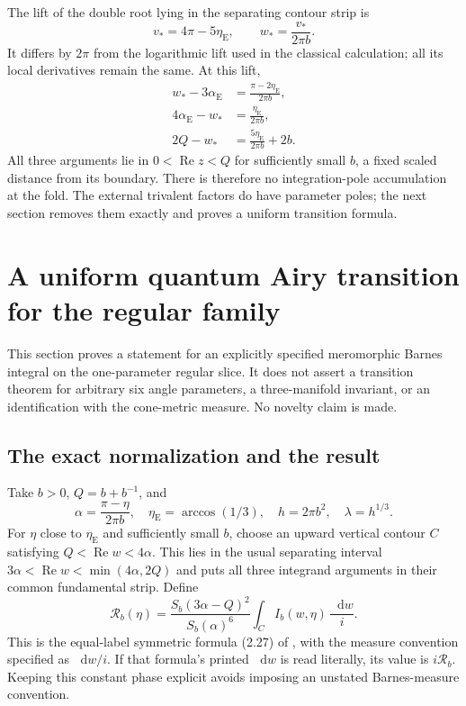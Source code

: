 \documentclass[11pt,a4paper]{article}
\numberwithin{equation}{section}
\theoremstyle{definition}
\theoremstyle{remark}
\newcommand{\dd}{\mathop{}\!\mathrm d}
\begin{document}
The lift of the double root lying in the separating contour strip is
\[
 v_*=4\pi-5\eta_{\mathrm E},\qquad
 w_*=\frac{v_*}{2\pi b}.
\]
It differs by $2\pi$ from the logarithmic lift used in the classical
calculation; all its local derivatives remain the same. At this lift,
\begin{equation}
 \begin{aligned}
 w_*-3\alpha_{\mathrm E}
       &=\frac{\pi-2\eta_{\mathrm E}}{2\pi b},\\
 4\alpha_{\mathrm E}-w_*&=\frac{\eta_{\mathrm E}}{2\pi b},\\
 2Q-w_*&=\frac{5\eta_{\mathrm E}}{2\pi b}+2b.
 \end{aligned}
 \label{eq:correctfoldarguments}
\end{equation}
All three arguments lie in $0<\operatorname{Re}z<Q$ for
sufficiently small $b$, a fixed scaled distance from its boundary.
There is therefore no integration-pole accumulation at the fold.
The external trivalent factors do have parameter poles; the next
section removes them exactly and proves a uniform transition formula.

\section{A uniform quantum Airy transition for the regular family}
\label{sec:quantumAiry}

This section proves a statement for an explicitly specified
meromorphic Barnes integral on the one-parameter regular slice.
It does not assert a transition theorem for arbitrary six angle
parameters, a three-manifold invariant, or an identification with
the cone-metric measure. No novelty claim is made.

\subsection{The exact normalization and the result}

Take $b>0$, $Q=b+b^{-1}$, and
\[
 \alpha=\frac{\pi-\eta}{2\pi b},\quad
 \eta_{\mathrm E}=\arccos(1/3),\quad
 h=2\pi b^2,\quad \lambda=h^{1/3}.
\]
For $\eta$ close to $\eta_{\mathrm E}$ and sufficiently small $b$,
choose an upward vertical contour $C$ satisfying
$Q<\operatorname{Re}w<4\alpha$. This lies in the usual separating
interval $3\alpha<\operatorname{Re}w<\min(4\alpha,2Q)$ and puts
all three integrand arguments in their common fundamental strip.
Define
\begin{equation}
 \mathcal R_b(\eta)=
 \frac{S_b(3\alpha-Q)^2}{S_b(\alpha)^6}
 \int_C I_b(w,\eta)\,\frac{\dd w}{i}.
 \label{eq:realregularsymbol}
\end{equation}
This is the equal-label symmetric formula (2.27) of
\cite{TeschnerVartanov}, with the measure convention specified as
$\dd w/i$. If that formula's printed $\dd w$ is read literally,
its value is $i\mathcal R_b$. Keeping this constant phase explicit
avoids imposing an unstated Barnes-measure convention.
\end{document}
